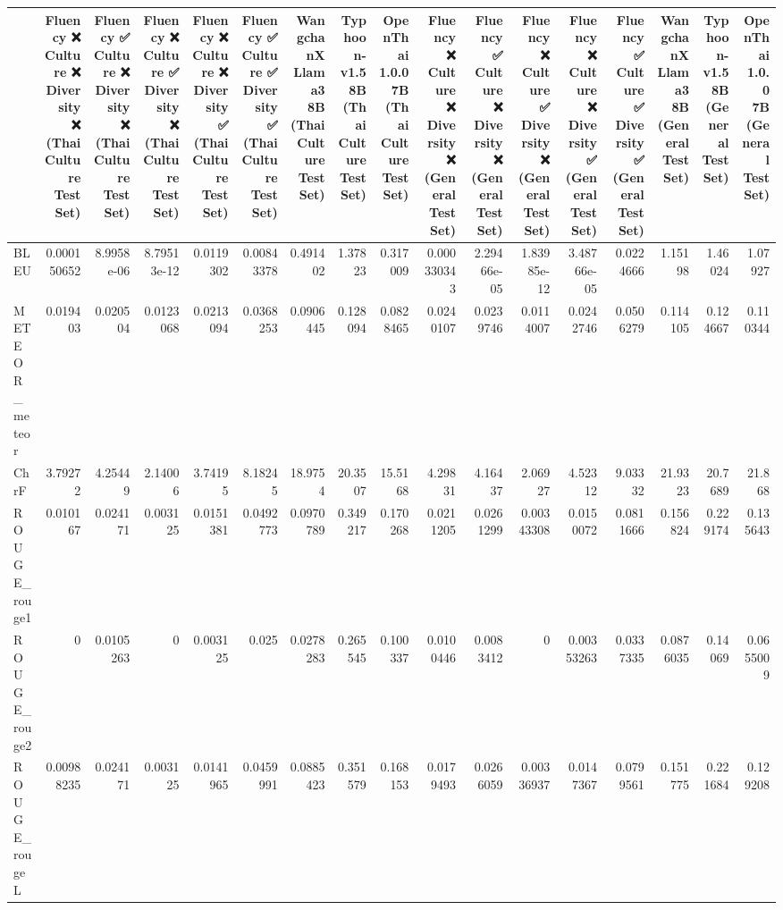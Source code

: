 \begin{tabular}{lrrrrrrrrrrrrrrrr}
\hline
                 &             Fluency ❌
 Culture ❌
 Diversity ❌
(Thai Culture Test Set) &            Fluency ✅
 Culture ❌
 Diversity ❌
(Thai Culture Test Set) &             Fluency ❌
 Culture ✅
 Diversity ❌
(Thai Culture Test Set) &           Fluency ❌
 Culture ❌
 Diversity ✅
(Thai Culture Test Set) &            Fluency ✅
 Culture ✅
 Diversity ✅
(Thai Culture Test Set) &            WangchanX Llama3 8B
(Thai Culture Test Set) &           Typhoon-v1.5 8B
(Thai Culture Test Set) &            OpenThai 1.0.0 7B
(Thai Culture Test Set) &             Fluency ❌
 Culture ❌
 Diversity ❌
(General Test Set) &             Fluency ✅
 Culture ❌
 Diversity ❌
(General Test Set) &             Fluency ❌
 Culture ✅
 Diversity ❌
(General Test Set) &             Fluency ❌
 Culture ❌
 Diversity ✅
(General Test Set) &           Fluency ✅
 Culture ✅
 Diversity ✅
(General Test Set) &            WangchanX Llama3 8B
(General Test Set) &           Typhoon-v1.5 8B
(General Test Set) &            OpenThai 1.0.0 7B
(General Test Set) \\
\hline
 BLEU            & 0.000150652 & 8.9958e-06 & 8.79513e-12 & 0.0119302 & 0.00843378 &  0.491402  &  1.37823  &  0.317009  & 0.000330343 & 2.29466e-05 & 1.83985e-12 & 3.48766e-05 & 0.0224666 &  1.15198   &  1.46024  &  1.07927   \\
 METEOR_meteor   & 0.019403    & 0.020504   & 0.0123068   & 0.0213094 & 0.0368253  &  0.0906445 &  0.128094 &  0.0828465 & 0.0240107   & 0.0239746   & 0.0114007   & 0.0242746   & 0.0506279 &  0.114105  &  0.124667 &  0.110344  \\
 ChrF            & 3.79272     & 4.25449    & 2.14006     & 3.74195   & 8.18245    & 18.9754    & 20.3507   & 15.5168    & 4.29831     & 4.16437     & 2.06927     & 4.52312     & 9.03332   & 21.9323    & 20.7689   & 21.868     \\
 ROUGE_rouge1    & 0.010167    & 0.024171   & 0.003125    & 0.0151381 & 0.0492773  &  0.0970789 &  0.349217 &  0.170268  & 0.0211205   & 0.0261299   & 0.00343308  & 0.0150072   & 0.0811666 &  0.156824  &  0.229174 &  0.135643  \\
 ROUGE_rouge2    & 0           & 0.0105263  & 0           & 0.003125  & 0.025      &  0.0278283 &  0.265545 &  0.100337  & 0.0100446   & 0.0083412   & 0           & 0.00353263  & 0.0337335 &  0.0876035 &  0.14069  &  0.0655009 \\
 ROUGE_rougeL    & 0.00988235  & 0.024171   & 0.003125    & 0.0141965 & 0.0459991  &  0.0885423 &  0.351579 &  0.168153  & 0.0179493   & 0.0266059   & 0.00336937  & 0.0147367   & 0.0799561 &  0.151775  &  0.221684 &  0.129208  \\

\end{tabular}
